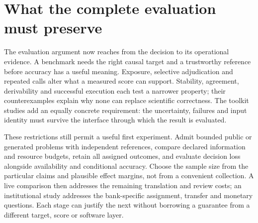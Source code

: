 \section{What the complete evaluation must preserve}

The evaluation argument now reaches from the decision to its operational evidence. A benchmark needs the right causal target and a trustworthy reference before accuracy has a useful meaning. Exposure, selective adjudication and repeated calls alter what a measured score can support. Stability, agreement, derivability and successful execution each test a narrower property; their counterexamples explain why none can replace scientific correctness. The toolkit studies add an equally concrete requirement: the uncertainty, failures and input identity must survive the interface through which the result is evaluated.

These restrictions still permit a useful first experiment. Admit bounded public or generated problems with independent references, compare declared information and resource budgets, retain all assigned outcomes, and evaluate decision loss alongside availability and conditional accuracy. Choose the sample size from the particular claims and plausible effect margins, not from a convenient collection. A live comparison then addresses the remaining translation and review costs; an institutional study addresses the bank-specific assignment, transfer and monetary questions. Each stage can justify the next without borrowing a guarantee from a different target, score or software layer.

